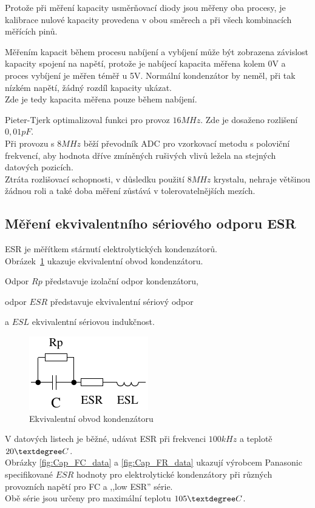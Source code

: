 Protože při měření kapacity usměrňovací diody jsou měřeny oba procesy,
je kalibrace nulové kapacity provedena v obou směrech a při všech kombinacích měřících pinů.

Měřením kapacit během procesu nabíjení a vybíjení může být zobrazena závislost kapacity spojení na napětí, protože je nabíjecí kapacita měřena kolem 0V a proces vybíjení je měřen téměř u 5V.
Normální kondenzátor by neměl, při tak nízkém napětí, žádný rozdíl kapacity ukázat.\\ Zde je tedy kapacita měřena pouze během nabíjení.

Pieter-Tjerk optimalizoval funkci pro provoz \(16MHz\). Zde je dosaženo rozlišení \(0,01pF\).\\
Při provozu s \(8MHz\) běží převodník ADC pro vzorkovací metodu s poloviční frekvencí, aby hodnota
dříve zmíněných rušivých vlivů ležela na stejných datových pozicích.\\
Ztráta rozlišovací schopnosti, v důsledku použití \(8MHz\) krystalu, nehraje většinou žádnou roli
a také doba měření zůstává v tolerovatelnějších mezích.

\subsection{Měření ekvivalentního sériového odporu ESR}

ESR \cite{ESR}  je měřítkem stárnutí elektrolytických kondenzátorů.\\

Obrázek~\ref{fig:Cap_equiv} ukazuje ekvivalentní obvod kondenzátoru.

Odpor \(Rp\) představuje izolační odpor kondenzátoru,

odpor \(ESR\) představuje ekvivalentní sériový odpor

a \(ESL\) ekvivalentní sériovou indukčnost.

\begin{figure}[H]
  \centering
    \includegraphics[]{../FIG/Cap_equiv.pdf}
  \caption{Ekvivalentní obvod kondenzátoru}
  \label{fig:Cap_equiv}
\end{figure}

V datových listech je běžné, udávat ESR při frekvenci \(100kHz\) a teplotě \(20\textdegree C\).\\
Obrázky \ref{fig:Cap_FC_data} a \ref{fig:Cap_FR_data} ukazují výrobcem Panasonic
specifikované  \(ESR\) hodnoty pro elektrolytické kondenzátory při různých provozních napětí pro FC 
a ,,low ESR'' série. \\
Obě série jsou určeny pro maximální teplotu \(105\textdegree C\).

